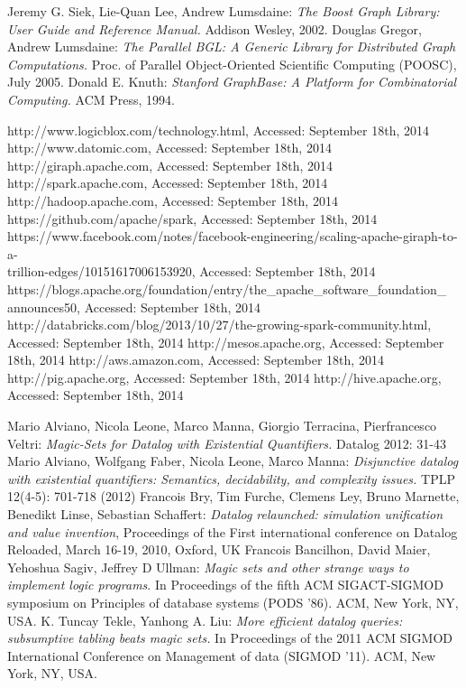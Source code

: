 \begin{thebibliography}{99}
 Jeremy G. Siek, Lie-Quan Lee, Andrew Lumsdaine: \textit{The Boost Graph Library: User Guide and Reference Manual.} Addison Wesley, 2002.
 Douglas Gregor, Andrew Lumsdaine: \textit{The Parallel BGL: A Generic Library for Distributed Graph Computations.} Proc. of Parallel Object-Oriented Scientific Computing (POOSC), July 2005.
 Donald E. Knuth: \textit{Stanford GraphBase: A Platform for Combinatorial Computing.} ACM Press, 1994.

 http://www.logicblox.com/technology.html, Accessed: September 18th, 2014
 http://www.datomic.com, Accessed: September 18th, 2014
 http://giraph.apache.com, Accessed: September 18th, 2014
 http://spark.apache.com, Accessed: September 18th, 2014
 http://hadoop.apache.com, Accessed: September 18th, 2014
 https://github.com/apache/spark, Accessed: September 18th, 2014
 https://www.facebook.com/notes/facebook-engineering/scaling-apache-giraph-to-a-\\trillion-edges/10151617006153920, Accessed: September 18th, 2014
 https://blogs.apache.org/foundation/entry/the\_apache\_software\_foundation\_\\announces50, Accessed: September 18th, 2014
 http://databricks.com/blog/2013/10/27/the-growing-spark-community.html, Accessed: September 18th, 2014
 http://mesos.apache.org, Accessed: September 18th, 2014
 http://aws.amazon.com, Accessed: September 18th, 2014
 http://pig.apache.org, Accessed: September 18th, 2014
 http://hive.apache.org, Accessed: September 18th, 2014

 Mario Alviano, Nicola Leone, Marco Manna, Giorgio Terracina, Pierfrancesco Veltri: \textit{Magic-Sets for Datalog with Existential Quantifiers.} Datalog 2012: 31-43
 Mario Alviano, Wolfgang Faber, Nicola Leone, Marco Manna: \textit{Disjunctive datalog with existential quantifiers: Semantics, decidability, and complexity issues.} TPLP 12(4-5): 701-718 (2012)
 Francois Bry, Tim Furche, Clemens Ley, Bruno Marnette, Benedikt Linse, Sebastian Schaffert: \textit{Datalog relaunched: simulation unification and value invention}, Proceedings of the First international conference on Datalog Reloaded, March 16-19, 2010, Oxford, UK
 Francois Bancilhon, David Maier, Yehoshua Sagiv, Jeffrey D Ullman: \textit{Magic sets and other strange ways to implement logic programs}. In Proceedings of the fifth ACM SIGACT-SIGMOD symposium on Principles of database systems (PODS '86). ACM, New York, NY, USA.
 K. Tuncay Tekle, Yanhong A. Liu: \textit{More efficient datalog queries: subsumptive tabling beats magic sets.} In Proceedings of the 2011 ACM SIGMOD International Conference on Management of data (SIGMOD '11). ACM, New York, NY, USA.


\end{thebibliography}
